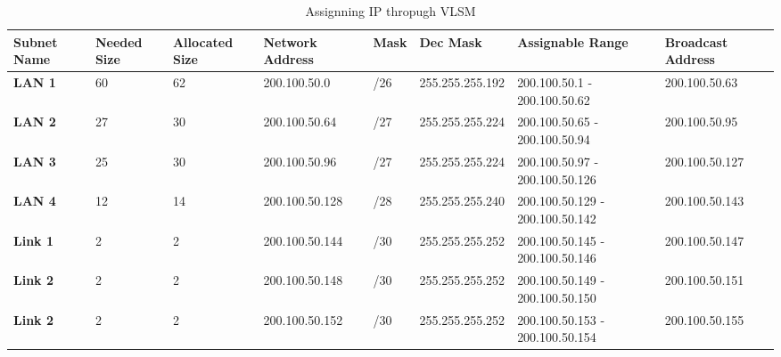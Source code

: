\documentclass[a4paper,11pt]{article}
\begin{document}
\begin{enumerate}
          \begin{table}[H]
              \centering
              \begin{tabular} {| m{3em} | m{3em} | m{4em} | m{6em} | m{2em} | m{7em} | m{7em} | m{6em} |}
                  \rowcolor[rgb]{0.278,0.573,0.792} \textbf{Subnet Name} & \textbf{Needed Size} & \textbf{Allocated Size} & \textbf{Network Address} & \textbf{Mask} & \textbf{Dec Mask} & \textbf{Assignable Range}       & \textbf{Broadcast Address} \\
                  \hline
                  \textbf{LAN 1}                                         & 60                   & 62                      & 200.100.50.0             & /26           & 255.255.255.192   & 200.100.50.1 - 200.100.50.62    & 200.100.50.63              \\
                  \hline
                  \textbf{LAN 2}                                         & 27                   & 30                      & 200.100.50.64            & /27           & 255.255.255.224   & 200.100.50.65 - 200.100.50.94   & 200.100.50.95              \\
                  \hline
                  \textbf{LAN 3}                                         & 25                   & 30                      & 200.100.50.96            & /27           & 255.255.255.224   & 200.100.50.97 - 200.100.50.126  & 200.100.50.127             \\
                  \hline
                  \textbf{LAN 4}                                         & 12                   & 14                      & 200.100.50.128           & /28           & 255.255.255.240   & 200.100.50.129 - 200.100.50.142 & 200.100.50.143             \\
                  \hline
                  \textbf{Link 1}                                        & 2                    & 2                       & 200.100.50.144           & /30           & 255.255.255.252   & 200.100.50.145 - 200.100.50.146 & 200.100.50.147             \\
                  \hline
                  \textbf{Link 2}                                        & 2                    & 2                       & 200.100.50.148           & /30           & 255.255.255.252   & 200.100.50.149 - 200.100.50.150 & 200.100.50.151             \\
                  \hline
                  \textbf{Link 2}                                        & 2                    & 2                       & 200.100.50.152           & /30           & 255.255.255.252   & 200.100.50.153 - 200.100.50.154 & 200.100.50.155             \\
                  \hline
              \end{tabular}
              \caption{Assignning IP thropugh VLSM}
          \end{table}



\end{enumerate}
\end{document}
